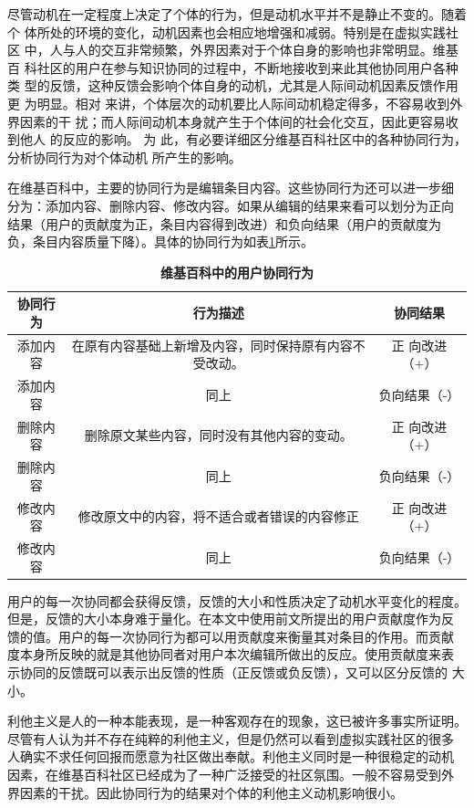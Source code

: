 尽管动机在一定程度上决定了个体的行为，但是动机水平并不是静止不变的。随着个
体所处的环境的变化，动机因素也会相应地增强和减弱。特别是在虚拟实践社区
中，人与人的交互非常频繁，外界因素对于个体自身的影响也非常明显。维基百
科社区的用户在参与知识协同的过程中，不断地接收到来此其他协同用户各种类
型的反馈，这种反馈会影响个体自身的动机，尤其是人际间动机因素反馈作用更
为明显。相对
来讲，个体层次的动机要比人际间动机稳定得多，不容易收到外界因素的干
扰；而人际间动机本身就产生于个体间的社会化交互，因此更容易收到他人
的反应的影响。
为
此，有必要详细区分维基百科社区中的各种协同行为，分析协同行为对个体动机
所产生的影响。

在维基百科中，主要的协同行为是编辑条目内容。这些协同行为还可以进一步细
分为：添加内容、删除内容、修改内容。如果从编辑的结果来看可以划分为正向
结果（用户的贡献度为正，条目内容得到改进）和负向结果（用户的贡献度为
负，条目内容质量下降）。具体的协同行为如表\ref{tab:collaboration-activities}所示。
\begin{table}[htb]
  \centering
 \small
  \caption{\small{\textbf{维基百科中的用户协同行为}}}
  \begin{tabular}{|c|c|c|}

\hline
    协同行为&行为描述&协同结果\\\hline
    添加内容&在原有内容基础上新增及内容，同时保持原有内容不受改动。&正
    向改进（+）\\\hline
    添加内容&同上&负向结果（-）\\\hline
    删除内容&删除原文某些内容，同时没有其他内容的变动。&正
    向改进（+）\\\hline
    删除内容&同上&负向结果（-）\\\hline
    修改内容&修改原文中的内容，将不适合或者错误的内容修正&正
    向改进（+）\\\hline
    修改内容&同上&负向结果（-）\\\hline
     \end{tabular}

  \label{tab:collaboration-activities}
\end{table}

用户的每一次协同都会获得反馈，反馈的大小和性质决定了动机水平变化的程度。
但是，反馈的大小本身难于量化。在本文中使用前文所提出的用户贡献度作为反
馈的值。用户的每一次协同行为都可以用贡献度来衡量其对条目的作用。而贡献
度本身所反映的就是其他协同者对用户本次编辑所做出的反应。使用贡献度来表
示协同的反馈既可以表示出反馈的性质（正反馈或负反馈），又可以区分反馈的
大小。

利他主义是人的一种本能表现，是一种客观存在的现象，这已被许多事实所证明。
尽管有人认为并不存在纯粹的利他主义，但是仍然可以看到虚拟实践社区的很多
人确实不求任何回报而愿意为社区做出奉献。利他主义同时是一种很稳定的动机
因素，在维基百科社区已经成为了一种广泛接受的社区氛围。一般不容易受到外
界因素的干扰。因此协同行为的结果对个体的利他主义动机影响很小。


